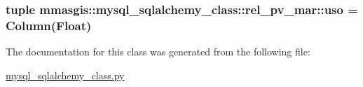 \label{classmmasgis_1_1mysql__sqlalchemy__class_1_1rel__pv__mar_a1dd3a942d6f45bf240397cdf80aa8340}
\hypertarget{classmmasgis_1_1mysql__sqlalchemy__class_1_1rel__pv__mar_a3b210e17b95c314990999ff35601cbc1}{
\subsubsection[{uso}]{\setlength{\rightskip}{0pt plus 5cm}tuple {\bf mmasgis::mysql\_\-sqlalchemy\_\-class::rel\_\-pv\_\-mar::uso} = Column(Float)}}
\label{classmmasgis_1_1mysql__sqlalchemy__class_1_1rel__pv__mar_a3b210e17b95c314990999ff35601cbc1}


The documentation for this class was generated from the following file:\begin{DoxyCompactItemize}
\item 
\hyperlink{mysql__sqlalchemy__class_8py}{mysql\_\-sqlalchemy\_\-class.py}\end{DoxyCompactItemize}
